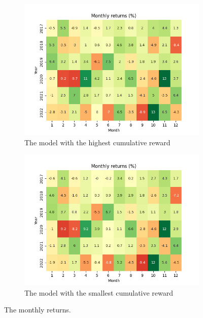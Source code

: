 \documentclass[../xlapes02]{subfiles}
\begin{document}
    \begin{figure}[h!]
        \centering
        \begin{subfigure}[b]{\experimentimgwidth\textwidth}
            \centering
            \includegraphics[width=\linewidth]{image/figure/monthly_returns_heatmap_max}
            \caption{The model with the highest cumulative reward}
        \end{subfigure}
        \hfill
        \begin{subfigure}{\experimentimgwidth\textwidth}
            \centering
            \includegraphics[width=\linewidth]{image/figure/monthly_returns_heatmap_min}
            \caption{The model with the smallest cumulative reward}
        \end{subfigure}
        \caption{The monthly returns.}
        \label{fig:Monthly returns heatmap}
    \end{figure}
\end{document}
